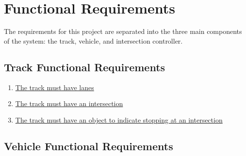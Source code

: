 \documentclass [11pt]{article}
\begin{document}

\section {Functional Requirements} 
The requirements for this project are separated into the three main components of the system: the track, vehicle, and intersection controller.






\subsection{Track Functional Requirements}
\begin{enumerate}[label=\textbf{T\arabic*:}, ref=T\arabic*, leftmargin =0.8in]
	\item \label{T1} \hyperref[sec:changeL]{The track must have lanes } %
	\item \label{T2} \hyperref[sec:changeL]{The track must have an intersection} %
	\item \label {T3} \hyperref[sec:changeL]{The track must have an object to indicate stopping at an intersection}  %
\end{enumerate}





\subsection{Vehicle Functional Requirements}
\end{document}

